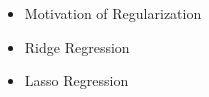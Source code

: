 \begin{itemize}
	\item Motivation of Regularization
	\item Ridge Regression
	\item Lasso Regression
\end{itemize}